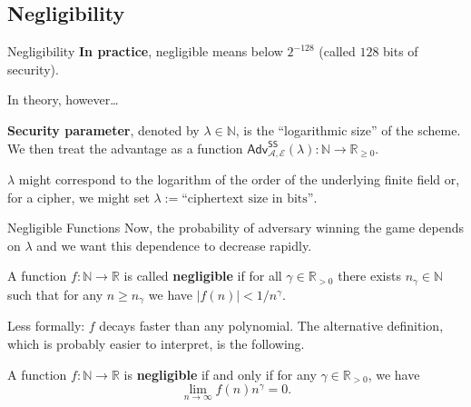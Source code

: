 \documentclass{zkdl-presentation-template}
\begin{document}
    \subsection{Negligibility}

    \begin{frame}{Negligibility}
        \textbf{In practice}, negligible means below $2^{-128}$ (called $128$ bits of security).

        In theory, however\ldots
        \pause

        \begin{definition}
            \textbf{Security parameter}, denoted by $\lambda \in \mathbb{N}$, is the ``logarithmic size'' of the scheme. We then treat the advantage as a function $\textsf{Adv}^{\textsf{SS}}_{\mathcal{A},\mathcal{E}}(\lambda): \mathbb{N} \to \mathbb{R}_{\geq 0}$.
        \end{definition}
        \pause

        \begin{example}
            $\lambda$ might correspond to the logarithm of the order of the underlying finite field or, for a cipher, we might set $\lambda := \text{``ciphertext size in bits''}$.
        \end{example}
    \end{frame}

    \begin{frame}{Negligible Functions}
        Now, the probability of adversary winning the game depends on $\lambda$ and we want this dependence to decrease rapidly.

        \begin{definition}
            A function $f: \mathbb{N} \to \mathbb{R}$ is called \textbf{negligible} if for all $\gamma \in \mathbb{R}_{>0}$ there exists $n_{\gamma} \in \mathbb{N}$ such that for any $n \geq n_{\gamma}$ we have $|f(n)| < 1/n^{\gamma}$.
        \end{definition}
        \pause

        Less formally: $f$ decays faster than any polynomial. The alternative definition, which is probably easier to interpret, is the following.

        \begin{theorem}
            A function $f: \mathbb{N} \to \mathbb{R}$ is \textbf{negligible} if and only if for any $\gamma \in \mathbb{R}_{>0}$, we have
            \begin{equation*}
                \lim_{n \to \infty} f(n)n^{\gamma} = 0.
            \end{equation*}
        \end{theorem}
    \end{frame}
\end{document}

